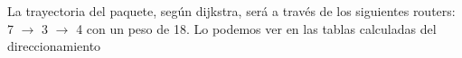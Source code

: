 \documentclass[12pt]{article} %
\begin{document}
\begin{figure}[H] %
\label{fig:config_1_B}
\end{figure}

La trayectoria del paquete, según dijkstra, será a través de los siguientes routers: 7 $\rightarrow$ 3 $\rightarrow$ 4 con un peso de 18. Lo podemos ver en las tablas calculadas del direccionamiento

\begin{figure}[H] %
\label{fig:config_1_C_D_y_E}
\end{figure}

\begin{figure}[H] %
\label{fig:config_1_C_D_y_E_2}
\end{figure}
\end{document}
